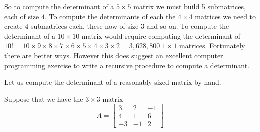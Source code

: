 \documentclass{ximera}
\begin{document}
So to compute the determinant of a $5\times 5$ matrix we must build 5
submatrices, each of size $4$.  To compute the determinants of each
the $4\times 4$ matrices we need to create 4 submatrices each, these
now of size $3$ and so on.  To compute the determinant of a
$10\times 10$ matrix would require computing the determinant of
$10!=10\times 9\times 8\times 7\times 6\times 5\times 4\times 3\times
2=3,628,800$ $1\times 1$ matrices.  Fortunately there are better ways.
However this does suggest an excellent computer programming exercise
to write a recursive procedure to compute a determinant.

Let us compute the determinant of a reasonably sized matrix by hand.

\begin{example}
  Suppose that we have the $3\times 3$ matrix
  \[
    A=
    \begin{bmatrix}
      3 & 2 & -1\\
      4 & 1 & 6\\
      -3 & -1 & 2
    \end{bmatrix}
  \]


\end{example}
\end{document}
